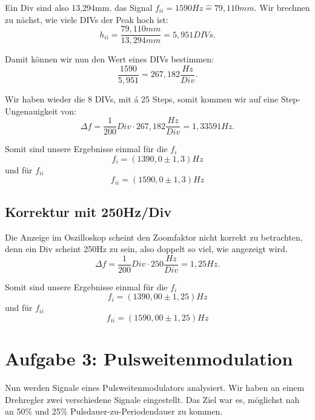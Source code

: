 Ein Div sind also 13,294mm. das Signal $f_{ii} = 1590 Hz \hat = 79,110mm$. Wir brechnen zu nächst, wie viele DIVs der Peak hoch ist:
\begin{equation}
    h_{ii} = \frac{79,110mm}{13,294mm} = 5,951 DIVs.
\end{equation}

Damit können wir nun den Wert eines DIVs bestimmen:
\begin{equation}
    \frac{1590}{5,951} = 267,182 \frac{Hz}{Div}.
\end{equation}

Wir haben wieder die 8 DIVs, mit á 25 Steps, somit kommen wir auf eine Step-Ungenauigkeit von:
\begin{equation}
    \Delta f = \frac{1}{200} Div \cdot 267,182 \frac{Hz}{Div} = 1,33591 Hz.
\end{equation}

Somit sind unsere Ergebnisse einmal für die $f_{i}$
\begin{equation}
    \boxed{
        f_{i} = (1390,0 \pm 1,3) Hz
    }
\end{equation}
und für $f_{ii}$
\begin{equation}
    \boxed{
        f_{ii} = (1590,0 \pm 1,3) Hz
    }
\end{equation}

\subsection*{Korrektur mit 250Hz/Div}
Die Anzeige im Oszilloskop scheint den Zoomfaktor nicht korrekt zu betrachten, denn ein Div scheint 250Hz zu sein, also doppelt so viel, wie angezeigt wird.
\begin{equation}
    \Delta f = \frac{1}{200} Div \cdot 250 \frac{Hz}{Div} = 1,25 Hz.
\end{equation}

Somit sind unsere Ergebnisse einmal für die $f_{i}$
\begin{equation}
    \boxed{
        f_{i} = (1390,00 \pm 1,25) Hz
    }
\end{equation}
und für $f_{ii}$
\begin{equation}
    \boxed{
        f_{ii} = (1590,00 \pm 1,25) Hz
    }
\end{equation}
\newpage
\onecolumn
\twocolumn


\section{Aufgabe 3: Pulsweitenmodulation}
Nun werden Signale eines Pulsweitenmodulators analysiert. Wir haben an einem Drehregler zwei verschiedene Signale eingestellt. Das Ziel war es, möglichst nah an 50\% und 25\% Pulsdauer-zu-Periodendauer zu kommen.

